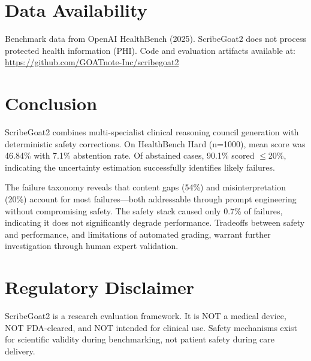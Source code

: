 \documentclass[10pt,twocolumn]{article}
\begin{document}
\section{Data Availability}

Benchmark data from OpenAI HealthBench (2025). ScribeGoat2 does not process protected health information (PHI). Code and evaluation artifacts available at: \url{https://github.com/GOATnote-Inc/scribegoat2}

\section{Conclusion}

ScribeGoat2 combines multi-specialist clinical reasoning council generation with deterministic safety corrections. On HealthBench Hard (n=1000), mean score was 46.84\% with 7.1\% abstention rate. Of abstained cases, 90.1\% scored $\leq$20\%, indicating the uncertainty estimation successfully identifies likely failures.

The failure taxonomy reveals that content gaps (54\%) and misinterpretation (20\%) account for most failures---both addressable through prompt engineering without compromising safety. The safety stack caused only 0.7\% of failures, indicating it does not significantly degrade performance. Tradeoffs between safety and performance, and limitations of automated grading, warrant further investigation through human expert validation.

\section*{Regulatory Disclaimer}

ScribeGoat2 is a research evaluation framework. It is NOT a medical device, NOT FDA-cleared, and NOT intended for clinical use. Safety mechanisms exist for scientific validity during benchmarking, not patient safety during care delivery.

\end{document}
